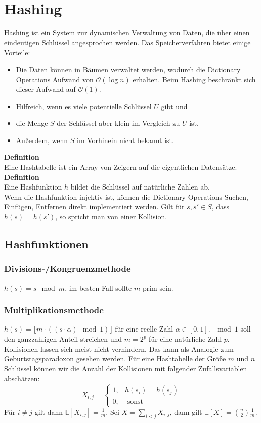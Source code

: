 \documentclass[a4paper, 12pt]{article}
\begin{document}
	\section{Hashing}
	Hashing ist ein System zur dynamischen Verwaltung von Daten, die über einen eindeutigen Schlüssel angesprochen werden. Das Speicherverfahren bietet einige Vorteile:\begin{itemize}
		\item Die Daten können in Bäumen verwaltet werden, wodurch die Dictionary Operations Aufwand von $\mathcal{O}(\log n)$ erhalten. Beim Hashing beschränkt sich dieser Aufwand auf $\mathcal{O}(1)$.
		\item Hilfreich, wenn es viele potentielle Schlüssel $U$ gibt und
		\item die Menge $S$ der Schlüssel aber klein im Vergleich zu $U$ ist.
		\item Außerdem, wenn $S$ im Vorhinein nicht bekannt ist.
	\end{itemize}	
	\textbf{Definition}\\
	Eine Hashtabelle ist ein Array von Zeigern auf die eigentlichen Datensätze. \\
	\textbf{Definition}\\
	Eine Hashfunktion $h$ bildet die Schlüssel auf natürliche Zahlen ab.\\
	
	Wenn die Hashfunktion injektiv ist, können die Dictionary Operations Suchen, Einfügen, Entfernen direkt implementiert werden. Gilt für $s,s' \in S$, dass $h(s) = h(s')$, so spricht man von einer Kollision.
	\subsection{Hashfunktionen}
	\subsubsection{Divisions-/Kongruenzmethode}
	$h(s) = s \mod m$, im besten Fall sollte $m$ prim sein.
	\subsubsection{Multiplikationsmethode}
	$h(s) = \lfloor m \cdot ((s\cdot \alpha) \mod 1)\rfloor$ für eine reelle Zahl $\alpha \in [0,1]$. $\mod 1$ soll den ganzzahligen Anteil streichen und $m = 2^p$ für eine natürliche Zahl $p$.\\
	
	Kollisionen lassen sich meist nicht verhindern. Das kann als Analogie zum Geburtstagsparadoxon gesehen werden. Für eine Hashtabelle der Größe $m$ und $n$ Schlüssel können wir die Anzahl der Kollisionen mit folgender Zufallsvariablen abschätzen: \[X_{i,j} = \begin{cases}
		1, & h(s_i) = h(s_j)\\
		0, & \text{ sonst}
	\end{cases}\]
	Für $i\neq j$ gilt dann $\mathbb{E}[X_{i,j}] = \frac{1}{m}$. Sei $X = \sum_{i<j} X_{i,j}$, dann gilt $\mathbb{E}[X] = \binom{n}{2} \frac{1}{m}$. 
\end{document}
